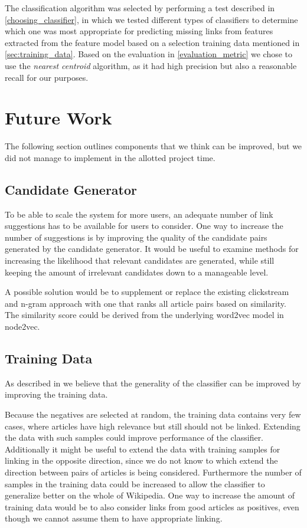 The classification algorithm was selected by performing a test described in \cref{choosing_classifier}, in which we tested different types of classifiers to determine which one was most appropriate for predicting missing links from features extracted from the feature model based on a selection training data mentioned in \cref{sec:training_data}. Based on the evaluation in \cref{evaluation_metric} we chose to use the \emph{nearest centroid} algorithm, as it had high precision but also a reasonable recall for our purposes. 


\section{Future Work}\label{sec:future_work}
The following section outlines components that we think can be improved, but we did not manage to implement in the allotted project time.

\subsection{Candidate Generator}
To be able to scale the system for more users, an adequate number of link suggestions has to be available for users to consider. One way to increase the number of suggestions is by improving the quality of the candidate pairs generated by the candidate generator. It would be useful to examine methods for increasing the likelihood that relevant candidates are generated, while still keeping the amount of irrelevant candidates down to a manageable level.

A possible solution would be to supplement or replace the existing clickstream and n-gram approach with one that ranks all article pairs based on similarity. The similarity score could be derived from the underlying word2vec model in node2vec.

\subsection{Training Data}
As described in  we believe that the generality of the classifier can be improved by improving the training data.

Because the negatives are selected at random, the training data contains very few cases, where articles have high relevance but still should not be linked. Extending the data with such samples could improve performance of the classifier. Additionally it might be useful to extend the data with training samples for linking in the opposite direction, since we do not know to which extend the direction between pairs of articles is being considered. Furthermore the number of samples in the training data could be increased to allow the classifier to generalize better on the whole of Wikipedia. One way to increase the amount of training data would be to also consider links from good articles as positives, even though we cannot assume them to have appropriate linking.

